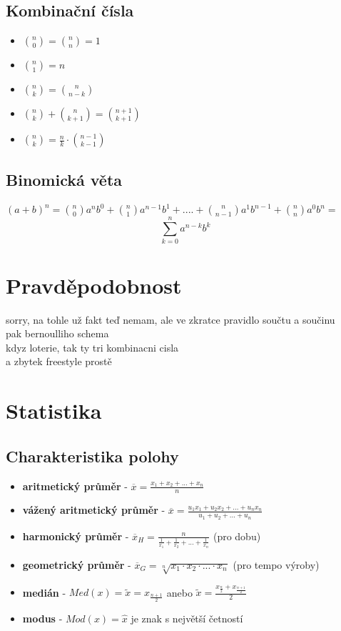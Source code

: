 \documentclass[12pt, a4paper]{article}
\begin{document}
\subsection*{Kombinační čísla}
\begin{itemize}
	\item ${{n}\choose{0}}={{n}\choose{n}}=1$
	\item ${{n}\choose{1}}=n$
	\item ${{n}\choose{k}}={{n}\choose{n-k}}$
	\item ${{n}\choose{k}}+{{n}\choose{k+1}}={{n+1}\choose{k+1}}$
	\item ${{n}\choose{k}} = \frac{n}{k}\cdot {{n-1}\choose{k-1}}$
\end{itemize}

\subsection*{Binomická věta}
$(a+b)^n = {{n}\choose{0}}a^nb^0 + {{n}\choose{1}}a^{n-1}b^1 + .... + {{n}\choose{n-1}}a^1b^{n-1} + {{n}\choose{n}}a^0b^n =$
\[ \sum_{k=0}^{n}a^{n-k}b^k \]

\section{Pravděpodobnost}
sorry, na tohle už fakt teď nemam, ale ve zkratce pravidlo součtu a součinu\\
pak bernoulliho schema\\
kdyz loterie, tak ty tri kombinacni cisla\\
a zbytek freestyle prostě

\section{Statistika}
\subsection*{Charakteristika polohy}
\begin{itemize}
	\item \textbf{aritmetický průměr} - $\overline{x} = \frac{x_1+x_2+...+x_n}{n}$
	\item \textbf{vážený aritmetický průměr} - $\overline{x} = \frac{u_1x_1 + u_2x_2 + ... + u_nx_n}{u_1+u_2+...+u_n}$
	\item \textbf{harmonický průměr} - $\overline{x}_H = \frac{n}{\frac{1}{x_1} + \frac{1}{x_2} + ... + \frac{1}{x_n}}$ (pro dobu)
	\item \textbf{geometrický průměr} - $\overline{x}_G = \sqrt[n]{x_1 \cdot x_2 \cdot ... \cdot x_n}$ (pro tempo výroby)
	\item \textbf{medián} - $Med(x) = \tilde{x} = x_{\frac{n+1}{2}}$ anebo $ \tilde{x}=\frac{x_\frac{n}{2}+x_\frac{n+1}{2}}{2}$
	\item \textbf{modus} - $Mod(x) = \hat{x}$ je znak s největší četností
\end{itemize}
\end{document}
